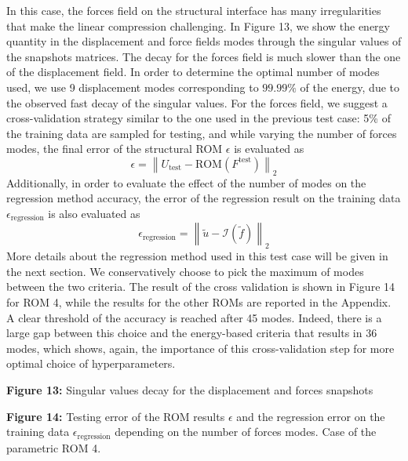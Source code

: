 \documentclass[11pt]{article}
\begin{document}
In this case, the forces field on the structural interface has many irregularities that make the linear compression challenging. In Figure 13, we show the energy quantity in the displacement and force fields modes through the singular values of the snapshots matrices. The decay for the forces field is much slower than the one of the displacement field. In order to determine the optimal number of modes used, we use 9 displacement modes corresponding to $99.99\%$ of the energy, due to the observed fast decay of the singular values. For the forces field, we suggest a cross-validation strategy similar to the one used in the previous test case: 5\% of the training data are sampled for testing, and while varying the number of forces modes, the final error of the structural ROM $\epsilon$ is evaluated as
\begin{equation}
\tag{30}
\epsilon = \left\|U_{\mathrm{test}} - \mathrm{ROM}(F^{\mathrm{test}})\right\|_2
\end{equation}
Additionally, in order to evaluate the effect of the number of modes on the regression method accuracy, the error of the regression result on the training data $\epsilon_{\mathrm{regression}}$ is also evaluated as
\begin{equation}
\tag{31}
\epsilon_{\mathrm{regression}} = \left\|\tilde{u} - \mathcal{I}(\tilde{f})\right\|_2
\end{equation}
More details about the regression method used in this test case will be given in the next section. We conservatively choose to pick the maximum of modes between the two criteria. The result of the cross validation is shown in Figure 14 for ROM 4, while the results for the other ROMs are reported in the Appendix. A clear threshold of the accuracy is reached after 45 modes. Indeed, there is a large gap between this choice and the energy-based criteria that results in 36 modes, which shows, again, the importance of this cross-validation step for more optimal choice of hyperparameters.

\begin{center}
\textbf{Figure 13:} Singular values decay for the displacement and forces snapshots
\end{center}

\begin{center}
\textbf{Figure 14:} Testing error of the ROM results $\epsilon$ and the regression error on the training data $\epsilon_{\mathrm{regression}}$ depending on the number of forces modes. Case of the parametric ROM 4.
\end{center}
\end{document}
